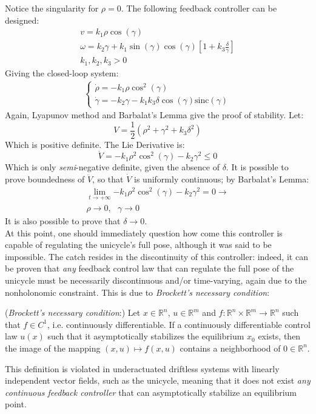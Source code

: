 Notice the singularity for $\rho=0$. The following feedback controller can be designed:
\begin{gather*}
    v=k_{1}\rho\cos(\gamma)\\
    \omega=k_{2}\gamma+k_{1}\sin(\gamma)\cos(\gamma)\left[1+k_{3}\frac{\delta}{\gamma}\right] \\
    k_{1},k_{2},k_{3}>0
\end{gather*}
Giving the closed-loop system:
\begin{gather*}
    \begin{cases}
        \dot{\rho}=-k_{1}\rho\cos^{2}(\gamma)\\
        \dot{\gamma}=-k_{2}\gamma-k_{1}k_{3}\delta\cos(\gamma)\text{sinc}(\gamma)
    \end{cases}
\end{gather*}
Again, Lyapunov method and Barbalat's Lemma give the proof of stability. Let:
\begin{equation*}
    V=\frac{1}{2}\left(\rho^{2}+\gamma^{2}+k_{3}\delta^{2}\right)
\end{equation*}
Which is positive definite. The Lie Derivative is:
\begin{equation*}
    \dot{V}=-k_{1}\rho^{2}\cos^{2}(\gamma)-k_{2}\gamma^{2}\leq 0
\end{equation*}
Which is only \textit{semi}-negative definite, given the absence of $\delta$. It is possible to prove boundedness of $\ddot{V}$, so that $\dot{V}$ is uniformly continuous; by Barbalat's Lemma:
\begin{gather*}
    \lim_{t \rightarrow +\infty}{-k_{1}\rho^{2}\cos^{2}(\gamma)-k_{2}\gamma^{2}}=0 \rightarrow \\
    \rho \rightarrow0,\text{ } \gamma\rightarrow0
\end{gather*}
It is also possible to prove that $\delta \rightarrow 0$. \\
At this point, one should immediately question how come this controller is capable of regulating the unicycle's full pose, although it was said to be impossible. The catch resides in the discontinuity of this controller: indeed, it can be proven that \textit{any} feedback control law that can regulate the full pose of the unicycle must be necessarily discontinuous and/or time-varying, again due to the nonholonomic constraint. This is due to \textit{Brockett's necessary condition}:
\begin{definition}\label{Brocketts_necessary_condition}
    (\textit{Brockett's necessary condition}:) Let $x \in \mathbb{R}^{n}$, $u \in \mathbb{R}^{m}$ and $f:\mathbb{R}^{n}\times \mathbb{R}^{m}\rightarrow\mathbb{R}^{n}$ such that $f \in C^{1}$, i.e. continuously differentiable. If a continuously differentiable control law $u(x)$ such that it asymptotically stabilizes the equilibrium $x_0$ exists, then the image of the mapping $(x,u) \mapsto f(x,u)$ contains a neighborhood of $0 \in \mathbb{R}^{n}$.
\end{definition}
This definition is violated in underactuated driftless systems with linearly independent vector fields, such as the unicycle, meaning that it does not exist \textit{any continuous feedback controller} that can asymptotically stabilize an equilibrium point.
